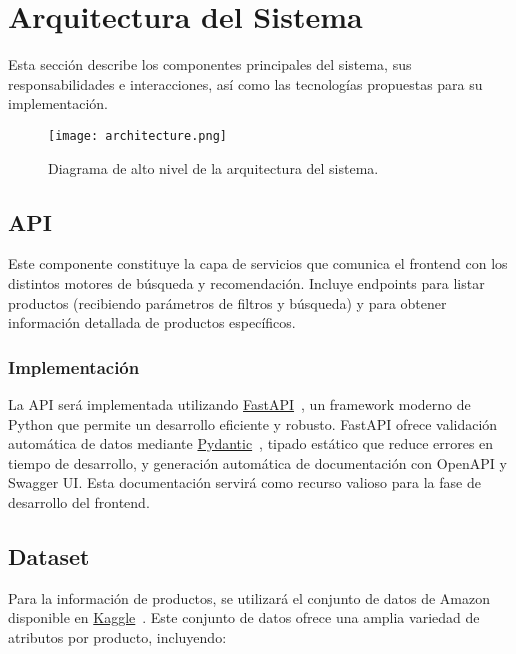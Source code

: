 \section{Arquitectura del Sistema}

Esta sección describe los componentes principales del sistema, sus responsabilidades e interacciones, así como las tecnologías propuestas para su implementación.

\vspace{1cm}

\begin{figure}[H]
    \centering
    \texttt{[image: architecture.png]}
    \caption{Diagrama de alto nivel de la arquitectura del sistema.}
    \label{fig:system_architecture}
\end{figure}

\subsection{API}

Este componente constituye la capa de servicios que comunica el frontend con los distintos motores de búsqueda y recomendación. Incluye endpoints para listar productos (recibiendo parámetros de filtros y búsqueda) y para obtener información detallada de productos específicos.

\subsubsection{Implementación}

La API será implementada utilizando \href{https://fastapi.tiangolo.com/}{FastAPI}~\cite{FastAPI}, un framework moderno de Python que permite un desarrollo eficiente y robusto. FastAPI ofrece validación automática de datos mediante \href{https://docs.pydantic.dev/latest/}{Pydantic}~\cite{Pydantic}, tipado estático que reduce errores en tiempo de desarrollo, y generación automática de documentación con OpenAPI y Swagger UI. Esta documentación servirá como recurso valioso para la fase de desarrollo del frontend.

\subsection{Dataset}

Para la información de productos, se utilizará el conjunto de datos de Amazon disponible en \href{https://www.kaggle.com/datasets/lokeshparab/amazon-products-dataset/data?select=Amazon-Products.csv}{Kaggle}~\cite{Amazon}. Este conjunto de datos ofrece una amplia variedad de atributos por producto, incluyendo:

